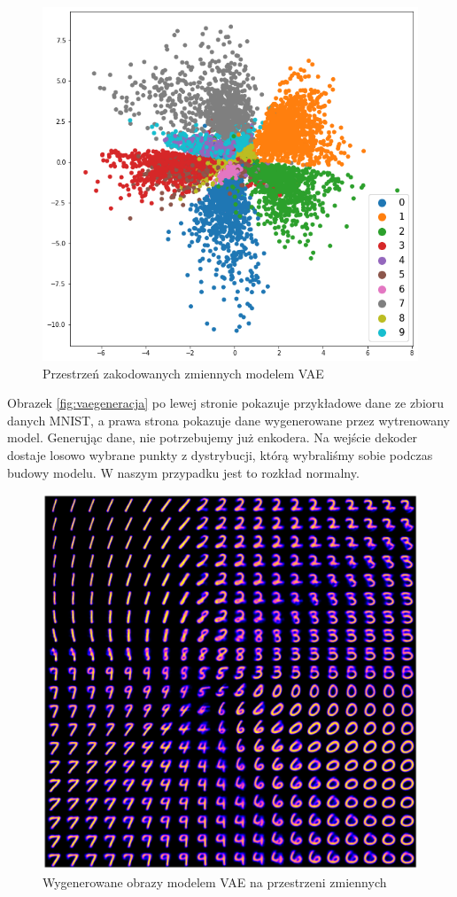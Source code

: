\documentclass[a4paper,12pt,oneside]{book} %
\begin{document}
\begin{figure}[h!]
	\centering
	\includegraphics[width=12cm]{vaelatentspace.png}
	\caption{Przestrzeń zakodowanych zmiennych modelem VAE}
	\label{fig:vaelatent}
\end{figure}
Obrazek \ref{fig:vaegeneracja} po lewej stronie pokazuje przykładowe dane ze zbioru danych MNIST, a prawa strona pokazuje dane wygenerowane przez wytrenowany model. Generując dane, nie potrzebujemy już enkodera. Na wejście dekoder dostaje losowo wybrane punkty z dystrybucji, którą wybraliśmy sobie podczas budowy modelu. W naszym przypadku jest to rozkład normalny.
\newpage
\begin{figure}[h!]
	\centering
	\includegraphics[width=14cm]{vaelatentgen.png}
	\caption{Wygenerowane obrazy modelem VAE na przestrzeni zmiennych}
	\label{fig:vaelatentgen}
\end{figure}
\end{document}
